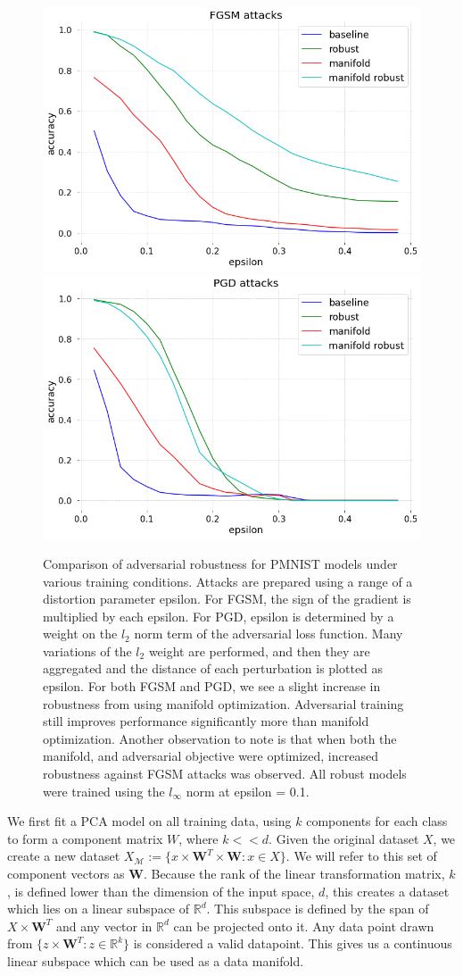 \begin{figure}[ht]
    \centering
    \includegraphics[width=0.45\linewidth]{c3_figures/FGSM_attacks_accuracy_known_manifold.png}\includegraphics[width=0.45\linewidth]{c3_figures/PGD_attacks_accuracy_known_manifold.png}
    \caption{Comparison of adversarial robustness for PMNIST models under various training conditions. Attacks are prepared using a range of a distortion parameter epsilon. For FGSM, the sign of the gradient is multiplied by each epsilon. For PGD, epsilon is determined by a weight on the $l_2$ norm term of the adversarial loss function. Many variations of the $l_2$ weight are performed, and then they are aggregated and the distance of each perturbation is plotted as epsilon. For both FGSM and PGD, we see a slight increase in robustness from using manifold optimization. Adversarial training still improves performance significantly more than manifold optimization. Another observation to note is that when both the manifold, and adversarial objective were optimized, increased robustness against FGSM attacks was observed. All robust models were trained using the $l_\infty$ norm at epsilon = 0.1.}
    \label{fig:model_robustness}
\end{figure}

We first fit a PCA model on all training data, using $k$ components
for each class to form a component matrix $W$, where $k << d$.
Given the original dataset $X$, we create a new dataset $X_{\mathcal{M}} := \{x \times \textbf{W}^T \times \textbf{W} : x \in X \}$.
We will refer to this set of component vectors as $\textbf{W}$.
Because the rank of the linear transformation matrix, $k$, is defined lower than the dimension of the input space, $d$, this creates a dataset which lies on a linear subspace of $\mathds{R}^d$.
This subspace is defined by the span of $X \times \textbf{W}^T$ and any vector in $\mathds{R}^d$ can be projected onto it.
Any data point drawn from $\{z \times \textbf{W}^T : z \in \mathds{R}^k \}$ is considered a valid datapoint.
This gives us a continuous linear subspace which can be used as a data manifold.

